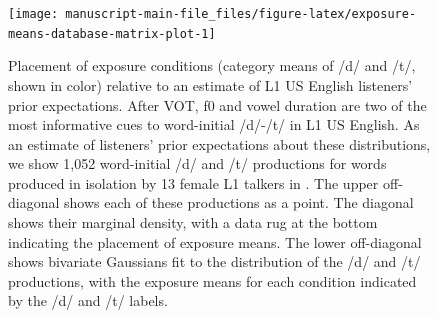 \documentclass[
  11pt,
  man,mask,floatsintext]{apa6}
\begin{document}
\begin{figure}[!ht]

{\centering \texttt{[image: manuscript-main-file\_files/figure-latex/exposure-means-database-matrix-plot-1]} 

}

\caption{Placement of exposure conditions (category means of /d/ and /t/, shown in color) relative to an estimate of L1 US English listeners' prior expectations. After VOT, f0 and vowel duration are two of the most informative cues to word-initial /d/-/t/ in L1 US English. As an estimate of listeners' prior expectations about these distributions, we show 1,052 word-initial /d/ and /t/ productions for words produced in isolation by 13 female L1 talkers in \textcite{chodroff-wilson2018}. The upper off-diagonal shows each of these productions as a point. The diagonal shows their marginal density, with a data rug at the bottom indicating the placement of exposure means. The lower off-diagonal shows bivariate Gaussians fit to the distribution of the /d/ and /t/ productions, with the exposure means for each condition indicated by the /d/ and /t/ labels.}\label{fig:exposure-means-database-matrix-plot}
\end{figure}
\end{document}
